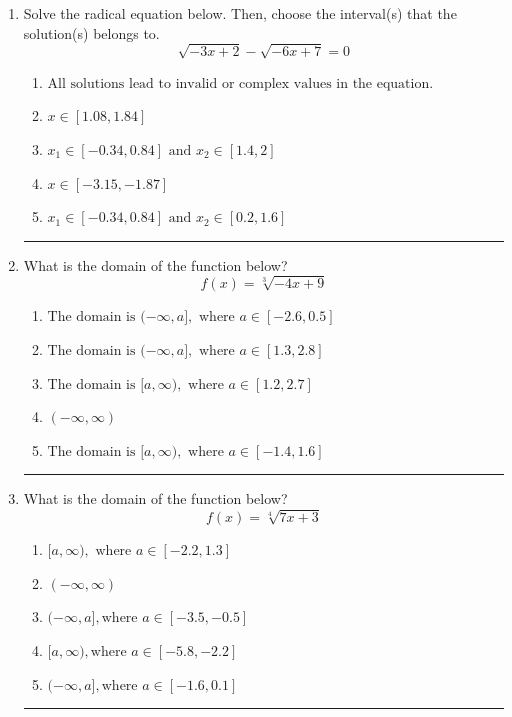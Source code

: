 \documentclass[14pt]{extbook}
\newcommand{\litem}[1]{\item#1\hspace*{-1cm}\rule{\textwidth}{0.4pt}}
\begin{document}
\begin{enumerate}
{\begin{enumerate}[label=\Alph*.]
\end{enumerate} }
\litem{
Solve the radical equation below. Then, choose the interval(s) that the solution(s) belongs to.\[ \sqrt{-3 x + 2} - \sqrt{-6 x + 7} = 0 \]\begin{enumerate}[label=\Alph*.]
\item \( \text{All solutions lead to invalid or complex values in the equation.} \)
\item \( x \in [1.08,1.84] \)
\item \( x_1 \in [-0.34, 0.84] \text{ and } x_2 \in [1.4,2] \)
\item \( x \in [-3.15,-1.87] \)
\item \( x_1 \in [-0.34, 0.84] \text{ and } x_2 \in [0.2,1.6] \)

\end{enumerate} }
\litem{
What is the domain of the function below?\[ f(x) = \sqrt[3]{-4 x + 9} \]\begin{enumerate}[label=\Alph*.]
\item \( \text{The domain is } (-\infty, a], \text{   where } a \in [-2.6, 0.5] \)
\item \( \text{The domain is } (-\infty, a], \text{   where } a \in [1.3, 2.8] \)
\item \( \text{The domain is } [a, \infty), \text{   where } a \in [1.2, 2.7] \)
\item \( (-\infty, \infty) \)
\item \( \text{The domain is } [a, \infty), \text{   where } a \in [-1.4, 1.6] \)

\end{enumerate} }
\litem{
What is the domain of the function below?\[ f(x) = \sqrt[4]{7 x + 3} \]\begin{enumerate}[label=\Alph*.]
\item \( [a, \infty), \text{ where } a \in [-2.2, 1.3] \)
\item \( (-\infty, \infty) \)
\item \( (-\infty, a], \text{where } a \in [-3.5, -0.5] \)
\item \( [a, \infty), \text{where } a \in [-5.8, -2.2] \)
\item \( (-\infty, a], \text{where } a \in [-1.6, 0.1] \)

\end{enumerate} }
\end{enumerate}
\end{document}

